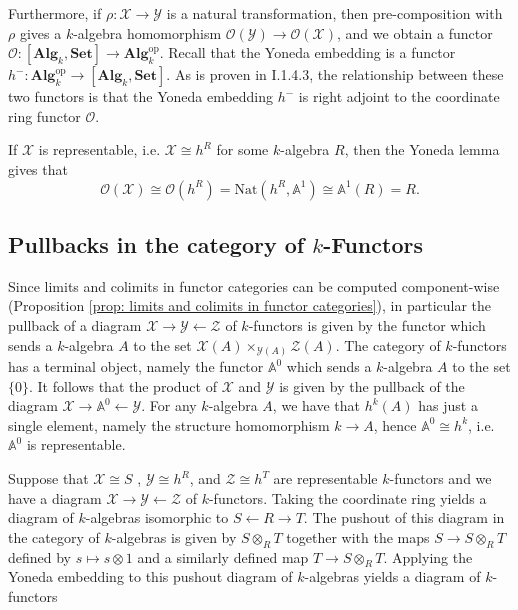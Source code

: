 \documentclass[oneside,11pt]{amsart}
\newcommand{\aaa}{\ensuremath{\mathbb{A}}}
\newcommand{\bSet}{\ensuremath{\textbf{Set}}}
\newcommand{\bAlg}{\ensuremath{\textbf{Alg}}}
\newcommand{\mX}{\ensuremath{\mathcal{X}}}
\newcommand{\mY}{\ensuremath{\mathcal{Y}}}
\newcommand{\mZ}{\ensuremath{\mathcal{Z}}}
\newcommand{\sO}{\ensuremath{\mathscr{O}}}
\newcommand{\Nat}{\ensuremath{\text{Nat}}}
\newcommand{\op}{\ensuremath{\text{op}}}
\theoremstyle{definition}
\newtheorem{proof techniques}{Proof Techniques}
\begin{document}
Furthermore, if $\rho : \mX \to \mY$ is a natural transformation, then pre-composition with $\rho$ gives a $k$-algebra homomorphism $\sO(\mY) \to \sO(\mX)$, and we obtain a functor $\sO : [\bAlg_k , \bSet] \to \bAlg_k^\op$. Recall that the Yoneda embedding is a functor $h^- : \bAlg_k^\op \to [\bAlg_k , \bSet]$. As is proven in \cite{demazure-gabriel1980} I.1.4.3, the relationship between these two functors is that the Yoneda embedding $h^-$ is right adjoint to the coordinate ring functor $\sO$. 

If $\mX$ is representable, i.e. $\mX \cong h^R$ for some $k$-algebra $R$, then the Yoneda lemma gives that
\begin{equation*}
\sO(\mX) \cong \sO(h^R) = \Nat(h^R , \aaa^1) \cong \aaa^1(R) = R.
\end{equation*}



\subsection{Pullbacks in the category of $k$-Functors}


Since limits and colimits in functor categories can be computed component-wise (Proposition \ref{prop: limits and colimits in functor categories}), in particular the pullback of a diagram $\mX \rightarrow \mY \leftarrow \mZ$ of $k$-functors is given by the functor which sends a $k$-algebra $A$ to the set $\mX(A) \times_{\mY(A)} \mZ(A)$. The category of $k$-functors has a terminal object, namely the functor $\aaa^0$ which sends a $k$-algebra $A$ to the set $\{ 0 \}$. It follows that the product of $\mX$ and $\mY$ is given by the pullback of the diagram $\mX \to \aaa^0 \leftarrow \mY$.  For any $k$-algebra $A$, we have that $h^k(A)$ has just a single element, namely the structure homomorphism $k \to A$, hence $\aaa^0 \cong h^k$, i.e. $\aaa^0$ is representable. 


Suppose that $\mX \cong S$ , $\mY \cong h^R$, and $\mZ \cong h^T$ are representable $k$-functors and we have a diagram $\mX \rightarrow \mY \leftarrow \mZ$ of $k$-functors. Taking the coordinate ring yields a diagram of $k$-algebras isomorphic to $S \leftarrow R \rightarrow T$. The pushout of this diagram in the category of $k$-algebras is given by $S \otimes_R T$ together with the maps $S \to S \otimes_R T$ defined by $s \mapsto s \otimes 1$ and a similarly defined map $T \to S \otimes_R T$. Applying the Yoneda embedding to this pushout diagram of $k$-algebras yields a diagram of $k$-functors
\end{document}
